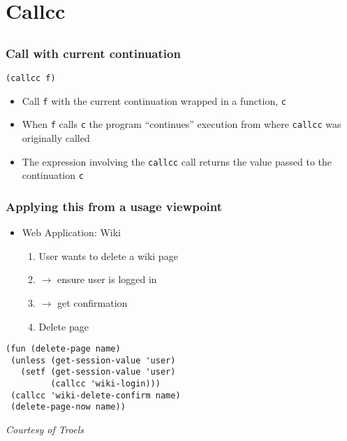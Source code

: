 \documentclass{beamer}
\begin{document}
\section{Callcc}
\subsection{} 
\begin{frame}[fragile]
\frametitle{Call with current continuation}

\begin{lstlisting}
(callcc f)
\end{lstlisting}

\begin{itemize}
\item Call \texttt{f} with the current continuation wrapped in a
  function, \texttt{c}
\item When \texttt{f} calls \texttt{c} the program ``continues''
  execution from where \texttt{callcc} was originally called
\item The expression involving the \texttt{callcc} call returns the
  value passed to the continuation \texttt{c}
\end{itemize}
\end{frame}

\begin{frame}[fragile]
\frametitle{Applying this from a usage viewpoint}
\begin{itemize}
\item Web Application: Wiki
  \begin{enumerate}
  \item User wants to delete a wiki page
  \item $\rightarrow$ ensure user is logged in 
  \item $\rightarrow$ get confirmation
  \item Delete page
  \end{enumerate}
\end{itemize}

\pause

\lstset{basicstyle=\footnotesize\ttfamily}
\begin{lstlisting}
(fun (delete-page name)
 (unless (get-session-value 'user)
   (setf (get-session-value 'user) 
         (callcc 'wiki-login)))
 (callcc 'wiki-delete-confirm name)
 (delete-page-now name))
\end{lstlisting}
\small
\emph{Courtesy of Troels}

\end{frame}
\end{document}
